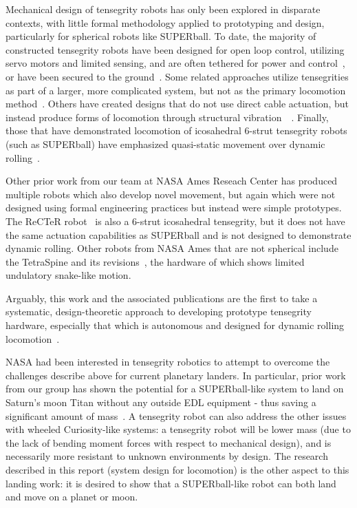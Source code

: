 \documentclass[12pt]{report}
\begin{document}
Mechanical design of tensegrity robots has only been explored in disparate contexts, with little formal methodology applied to prototyping and design, particularly for spherical robots like SUPERball.
To date, the majority of constructed tensegrity robots have been designed for open loop control, utilizing servo motors and limited sensing, and are often tethered for power and control~\cite{Koizumi2012b}, or have been secured to the ground~\cite{MiratsTur2010}.
Some related approaches utilize tensegrities as part of a larger, more complicated system, but not as the primary locomotion method~\cite{webster2013segmental}.
Others have created designs that do not use direct cable actuation, but instead produce forms of locomotion through structural vibration~\cite{khazanov2013exploiting}~\cite{bohm2013vibration}.
Finally, those that have demonstrated locomotion of icosahedral 6-strut tensegrity robots (such as SUPERball) have emphasized quasi-static movement over dynamic rolling~\cite{Shibata2009,Shibata2009a,Shibata2010}.

Other prior work from our team at NASA Ames Reseach Center has produced multiple robots which also develop novel movement, but again which were not designed using formal engineering practices but instead were simple prototypes.
The ReCTeR robot~\cite{Caluwaerts2013rsif,bruce2014design} is also a 6-strut icosahedral tensegrity, but it does not have the same actuation capabilities as SUPERball and is not designed to demonstrate dynamic rolling.
Other robots from NASA Ames that are not spherical include the TetraSpine and its revisions~\cite{Tietz2013,mirletz2014design}, the hardware of which shows limited undulatory snake-like motion.

Arguably, this work and the associated publications are the first to take a systematic, design-theoretic approach to developing prototype tensegrity hardware, especially that which is autonomous and designed for dynamic rolling locomotion~\cite{Caluwaerts2013rsif,sabelhaus2014hardware,bruce2014design,sabelhaus2015system}.

NASA had been interested in tensegrity robotics to attempt to overcome the challenges describe above for current planetary landers.
In particular, prior work from our group has shown the potential for a SUPERball-like system to land on Saturn's moon Titan without any outside EDL equipment - thus saving a significant amount of mass~\cite{Vytas_IPPW_2013,NIACfinalreport}.
A tensegrity robot can also address the other issues with wheeled Curiosity-like systems: a tensegrity robot will be lower mass (due to the lack of bending moment forces with respect to mechanical design), and is necessarily more resistant to unknown environments by design.
The research described in this report (system design for locomotion) is the other aspect to this landing work: it is desired to show that a SUPERball-like robot can both land and move on a planet or moon.
\end{document}

